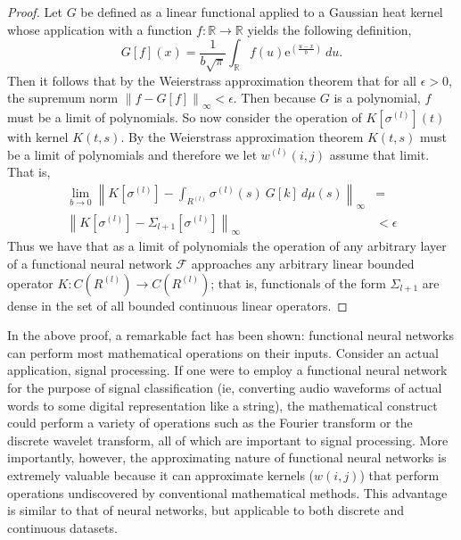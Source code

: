 \begin{proof}
Let $G$ be defined as a linear functional applied to a Gaussian heat kernel whose application with a function $f:\mathbb{R} \to \mathbb{R}$ yields the following definition, \begin{equation}G[f](x) = \frac1{b\sqrt{\pi}}\int_\mathbb{R} f(u)\mathrm{e}^{\left(\frac{u-x}b\right)}\ du.\end{equation}Then it follows that by the Weierstrass approximation theorem that for all $\epsilon > 0$, the supremum norm $\left\|f-G[f]\right\|_\infty < \epsilon$.   Then because $G$ is a polynomial, $f$ must be a limit of polynomials. So now consider the operation of $K\left[\sigma^{(l)}\right](t)$ with kernel  $K(t,s)$. By the Weierstrass approximation theorem $K(t,s)$ must be a limit of polynomials and therefore we let $w^{(l)}(i,j)$ assume that limit. That is,
\begin{equation}
\begin{aligned}
    \lim_{b \to 0}\left\|K\left[\sigma^{(l)}\right] -  \int_{R^{(l)}} \sigma^{(l)}(s)\ G[k]\  d\mu(s) \right\|_\infty &= \\
      \left\|K\left[\sigma^{(l)}\right] -  \Sigma_{l+1}\left[\sigma^{(l)}\right]  \right\|_\infty &< \epsilon
\end{aligned}
 \end{equation}
 Thus we have that as a limit of polynomials the operation of any arbitrary layer of a functional neural network $\mathcal{F}$ approaches any arbitrary linear bounded operator $K:C(R^{(l)})\to C(R^{(l)})$; that is, functionals of the form $\Sigma_{l+1}$ are dense in the set of all bounded continuous linear operators.
\end{proof}


In the above proof, a remarkable fact has been shown: functional neural networks can perform most mathematical operations on their inputs. Consider an actual application, signal processing. If one were to employ a functional neural network for the purpose of signal classification (ie, converting audio waveforms of actual words to some digital representation like a string), the mathematical construct could perform a variety of operations such as the Fourier transform or the discrete wavelet transform, all of which are important to signal processing. More importantly, however, the approximating nature of functional neural networks is extremely valuable because it can approximate kernels ($w(i,j)$) that perform operations undiscovered by conventional mathematical methods. This advantage is similar to that of neural networks, but applicable to both discrete and continuous datasets.


